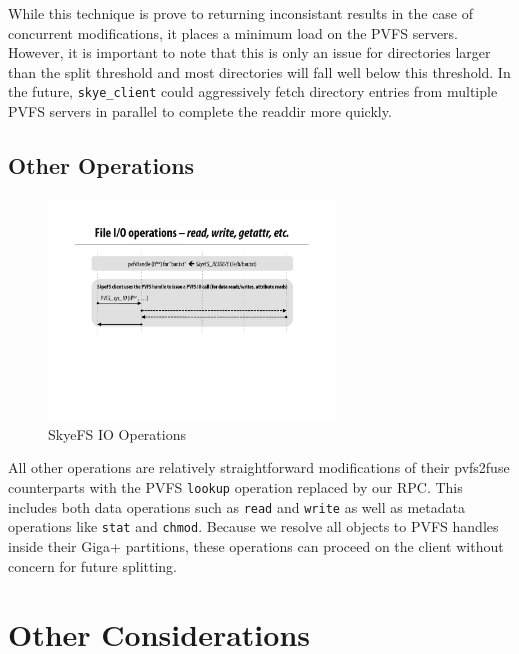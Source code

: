 \documentclass[twocolumn,letterpaper]{article}
\newcommand{\code}[1]{\texttt{#1}}
\begin{document}
While this technique is prove to returning inconsistant results in the case of
concurrent modifications, it places a minimum load on the PVFS servers.
However, it is important to note that this is only an issue for directories
larger than the split threshold and most directories will fall well below this
threshold.  In the future, \code{skye\_client} could aggressively fetch
directory entries from multiple PVFS servers in parallel to complete the
readdir more quickly.

\subsection{Other Operations}
\begin{figure}
\begin{center}
\includegraphics[width=3in]{figure-other}
\end{center}
\caption{SkyeFS IO Operations}
\end{figure}
All other operations are relatively straightforward modifications of their
pvfs2\-fuse counterparts with the PVFS \code{lookup} operation replaced by our
RPC.  This includes both data operations such as \code{read} and \code{write}
as well as metadata operations like \code{stat} and \code{chmod}.  Because we
resolve all objects to PVFS handles inside their Giga+ partitions, these
operations can proceed on the client without concern for future splitting.

\section{Other Considerations}
\end{document}

